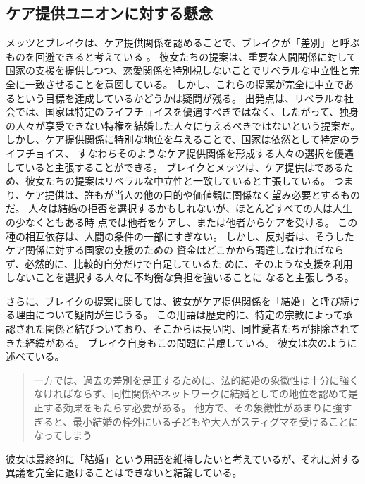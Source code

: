 \documentclass[paper=a4,book,openany]{jlreq} \usepackage{mystyle}
\begin{document}
\subsection{ケア提供ユニオンに対する懸念}

メッツとブレイクは、ケア提供関係を認めることで、ブレイクが「差別」と呼ぶものを回避できると考えている
\citep[p.89]{brake12:_minim_marriag}。
彼女たちの提案は、重要な人間関係に対して国家の支援を提供しつつ、恋愛関係を特別視しないことでリベラルな中立性と完全に一致させることを意図している。
しかし、これらの提案が完全に中立であるという目標を達成しているかどうかは疑問が残る。
出発点は、リベラルな社会では、国家は特定のライフチョイスを優遇すべきではなく、したがって、独身の人々が享受できない特権を結婚した人々に与えるべきではないという提案だ。
しかし、ケア提供関係に特別な地位を与えることで、国家は依然として特定のライフチョイス、
すなわちそのようなケア提供関係を形成する人々の選択を優遇していると主張することができる。
ブレイクとメッツは、ケア提供はであるため、彼女たちの提案はリベラルな中立性と一致していると主張している。
つまり、ケア提供は、誰もが当人の他の目的や価値観に関係なく望み必要とするものだ。
人々は結婚の拒否を選択するかもしれないが、ほとんどすべての人は人生の少なくともある時
点では他者をケアし、または他者からケアを受ける。
この種の相互依存は、人間の条件の一部にすぎない。
しかし、反対者は、そうしたケア関係に対する国家の支援のための
資金はどこかから調達しなければならず、必然的に、比較的自分だけで自足しているた
めに、そのような支援を利用しないことを選択する人々に不均衡な負担を強いることに
なると主張しうる。

さらに、ブレイクの提案に関しては、彼女がケア提供関係を「結婚」と呼び続ける理由について疑問が生じうる。
この用語は歴史的に、特定の宗教によって承認された関係と結びついており、そこからは長い間、同性愛者たちが排除されてきた経緯がある。
ブレイク自身もこの問題に苦慮している。
彼女は次のように述べている。

\begin{quote}
一方では、過去の差別を是正するために、法的結婚の象徴性は十分に強くなければならず、同性関係やネットワークに結婚としての地位を認めて是正する効果をもたらす必要がある。
他方で、その象徴性があまりに強すぎると、最小結婚の枠外にいる子どもや大人がスティグマを受けることになってしまう\citep[p.187]{brake12:_minim_marriag}
\end{quote}

彼女は最終的に「結婚」という用語を維持したいと考えているが、それに対する異議を完全に退けることはできないと結論している。
\end{document}
